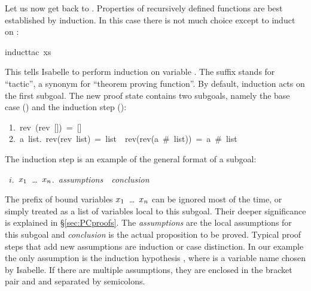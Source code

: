 \begin{isabellebody}
\begin{isamarkuptxt}
Let us now get back to . Properties of recursively
defined functions are best established by induction. In this case there is
not much choice except to induct on :%
\end{isamarkuptxt}%
induct{\isacharunderscore}tac\ xs{\isacharparenright}%
\begin{isamarkuptxt}%
\noindent{}%
This tells Isabelle to perform induction on variable . The suffix
 stands for ``tactic'', a synonym for ``theorem proving function''.
By default, induction acts on the first subgoal. The new proof state contains
two subgoals, namely the base case () and the induction step
():
\begin{isabelle}
~1.~rev~(rev~[])~=~[]\isanewline
~2.~{\isasymAnd}a~list.~rev(rev~list)~=~list~{\isasymLongrightarrow}~rev(rev(a~\#~list))~=~a~\#~list
\end{isabelle}

The induction step is an example of the general format of a subgoal:
\begin{isabelle}
~$i$.~{}$x\sb{1}$~\dots~$x\sb{n}$.~{\it assumptions}~{\isasymLongrightarrow}~{\it conclusion}
\end{isabelle}
The prefix of bound variables \isasymAnd$x\sb{1}$~\dots~$x\sb{n}$ can be
ignored most of the time, or simply treated as a list of variables local to
this subgoal. Their deeper significance is explained in \S\ref{sec:PCproofs}.
The {\it assumptions} are the local assumptions for this subgoal and {\it
  conclusion} is the actual proposition to be proved. Typical proof steps
that add new assumptions are induction or case distinction. In our example
the only assumption is the induction hypothesis , where  is a variable name chosen by Isabelle. If there
are multiple assumptions, they are enclosed in the bracket pair
 and
 and separated by semicolons.


\end{isamarkuptxt}
\end{isabellebody}
